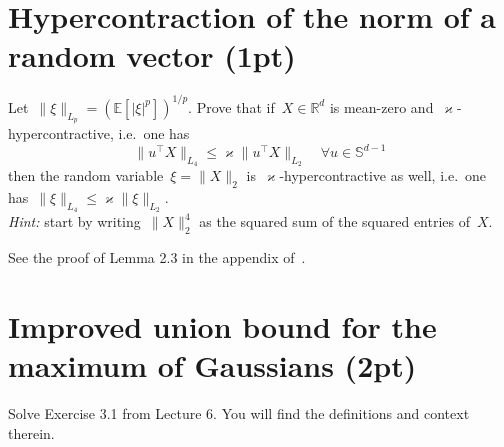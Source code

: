 \documentclass[11pt]{article}
\newcommand{\odima}[1]{{\color{red} #1}}
\newcommand{\R}{\mathds{R}}
\newcommand{\E}{\mathds{E}}
\newcommand{\leqs}{\leqslant}
\renewcommand{\le}{\leqs}
\begin{document}
\newpage
\section{Hypercontraction of the norm of a random vector (1pt)}
Let~$\|\xi\|_{L_p} = (\E[|\xi|^p])^{1/p}$. Prove that if~$X \in \R^d$ is \odima{mean-zero} and~$\varkappa$-hypercontractive, i.e.~one has
\[
\| u^\top X \|_{L_4} \le \varkappa \| u^\top X \|_{L_2} \quad \forall u \in \mathbb{S}^{d-1}
\]
then the random variable~$\xi = \| X \|_2$ is~$\varkappa$-hypercontractive as well, i.e.~one has~$\| \xi \|_{L_4} \le \varkappa \| \xi \|_{L_2}$.\\
{\em Hint:} start by writing~$\|X\|_{2}^4$ as the squared sum of the squared entries of~$X$.

\odima{See the proof of Lemma 2.3 in the appendix of~\cite{minsker2017estimation}.}

\newpage
\section{Improved union bound for the maximum of Gaussians (2pt)}

Solve Exercise 3.1 from Lecture 6. You will find the definitions and context therein.
\end{document}
